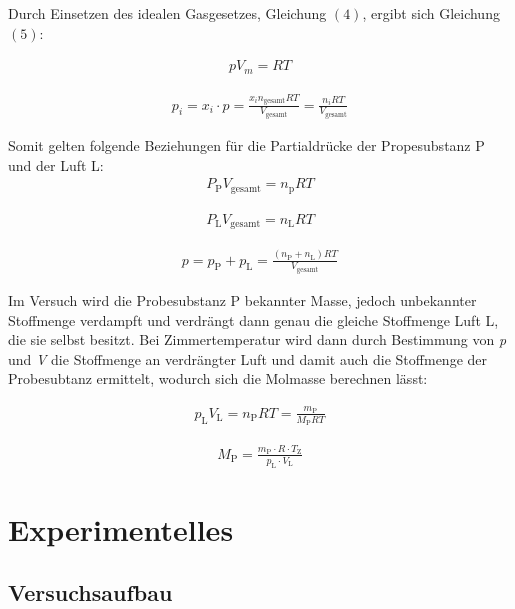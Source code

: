 \documentclass[12pt,a4paper,titlepage,headinclude,bibtotoc]{scrartcl}
\begin{document}
Durch Einsetzen des idealen Gasgesetzes, Gleichung $(4)$, ergibt sich Gleichung $(5)$:

\begin{align}
pV_m = RT
\end{align}

\begin{align}
p_i = x_i \cdot p = \frac{x_in_{\mathrm{gesamt}}RT}{V_{\mathrm{gesamt}}} = \frac{n_iRT}{V_{\mathrm{gesamt}}}
\end{align}


Somit gelten folgende Beziehungen  für die Partialdrücke der Propesubstanz P und der Luft L:
\begin{align}
P_{\mathrm{P}}V_{\mathrm{gesamt}} = n_{\mathrm{p}}RT
\end{align}

\begin{align}
P_{\mathrm{L}}V_{\mathrm{gesamt}} = n_{\mathrm{L}}RT
\end{align}

\begin{align}
p = p_{\mathrm{P}} + p_{\mathrm{L}} = \frac{ \left( n_{\mathrm{P}} + n_{\mathrm{L}} \right)RT}{V_{\mathrm{gesamt}}}
\end{align}

Im Versuch wird die Probesubstanz P bekannter Masse, jedoch unbekannter Stoffmenge verdampft und verdrängt dann genau die gleiche Stoffmenge Luft L, die sie selbst besitzt. Bei Zimmertemperatur wird dann durch Bestimmung von \textit{p} und \textit{V} die Stoffmenge an verdrängter Luft und damit auch die Stoffmenge der Probesubtanz ermittelt, wodurch sich die Molmasse berechnen lässt:  

\begin{align}
p_{\mathrm{L}} V_{\mathrm{L}} = n_{\mathrm{P}}RT = \frac{m_{\mathrm{P}}}{M_{\mathrm{P}}RT}
\end{align}

\begin{align}
M_{\mathrm{P}} = \frac{m_{\mathrm{P}}\cdot R \cdot T_{\mathrm{Z}}}{p_{\mathrm{L}} \cdot V_{\mathrm{L}}}
\end{align}

\section{Experimentelles}
\subsection{Versuchsaufbau}
\end{document}
